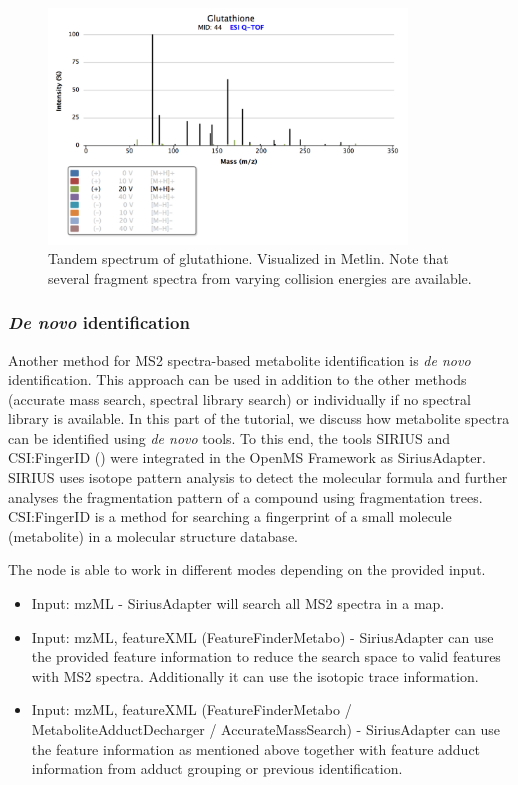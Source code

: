 \begin{figure}[htbp]
  \centering
  \includegraphics[width=0.85\textwidth]{graphics/metabo/glutathioneMetlin.png}
  \caption{Tandem spectrum of glutathione. Visualized in Metlin. Note that several fragment spectra from varying collision energies are available.}
  \label{fig:glutathioneMetlin}
\end{figure}

\subsubsection{\protect\textit{De novo} identification}

Another method for MS2 spectra-based metabolite identification is \textit{de novo} identification. 
This approach can be used in addition to the other methods (accurate mass search, spectral library search) or individually if no spectral library is available. In this part of the tutorial, we discuss how metabolite spectra can be identified using \textit{de novo} tools. To this end, the tools SIRIUS and CSI:FingerID (\cite{Bocker2009,Bocker2016,Duhrkop2015}) were integrated in the OpenMS Framework as SiriusAdapter. SIRIUS uses isotope pattern analysis to detect the molecular formula and further analyses the fragmentation pattern of a compound using fragmentation trees. CSI:FingerID  is a method for searching a fingerprint of a small molecule (metabolite) in a molecular structure database.

The node is able to work in different modes depending on the provided input. 
\begin{itemize}
\item Input: mzML - SiriusAdapter will search all MS2 spectra in a map.  
\item Input: mzML, featureXML (FeatureFinderMetabo) - SiriusAdapter can use the provided feature information to reduce the search space to valid features with MS2 spectra. Additionally it can use the isotopic trace information. 
\item Input: mzML, featureXML (FeatureFinderMetabo / MetaboliteAdductDecharger / AccurateMassSearch) - SiriusAdapter can use the feature information as mentioned above together with feature adduct information from adduct grouping or previous identification.
\end{itemize}

